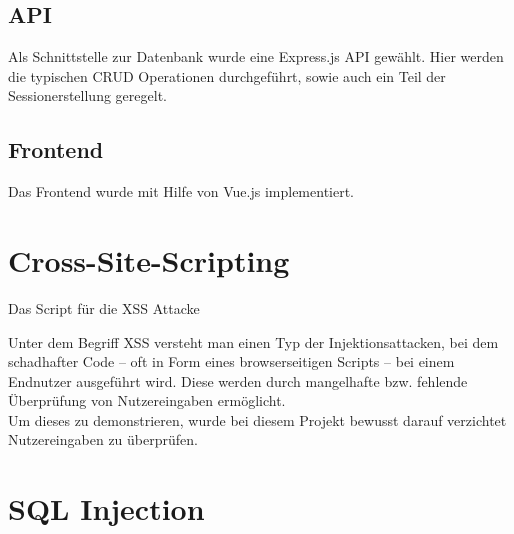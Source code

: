 \subsection{API}
Als Schnittstelle zur Datenbank wurde eine Express.js API gewählt. Hier werden die typischen CRUD Operationen durchgeführt, sowie auch ein Teil der Sessionerstellung geregelt. 
\subsection{Frontend}
Das Frontend wurde mit Hilfe von Vue.js implementiert.
\section{Cross-Site-Scripting}
Das Script für die \ac{XSS} Attacke

Unter dem Begriff \ac{XSS} versteht man einen Typ der Injektionsattacken, bei dem schadhafter Code – oft in Form eines browserseitigen Scripts – bei einem Endnutzer ausgeführt wird. Diese werden durch mangelhafte bzw. fehlende Überprüfung von Nutzereingaben ermöglicht. \\
Um dieses zu demonstrieren, wurde bei diesem Projekt bewusst darauf verzichtet Nutzereingaben zu überprüfen. 





\section{SQL Injection}